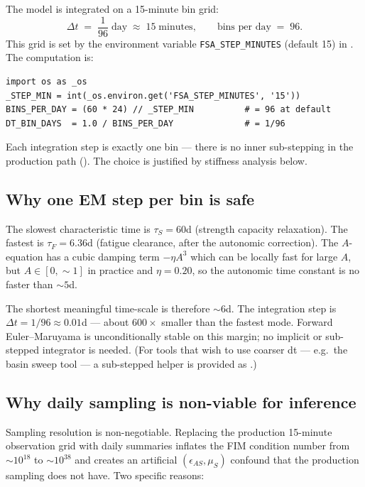 \documentclass[11pt,a4paper]{article}
\theoremstyle{definition}
\begin{document}
The model is integrated on a 15-minute bin grid:
\begin{equation}
\Delta t \;=\; \frac{1}{96}\;\text{day} \;\approx\; 15\;\text{minutes}, \qquad
\text{bins per day} \;=\; 96.
\end{equation}
This grid is set by the environment variable \texttt{FSA\_STEP\_MINUTES}
(default 15) in . The
computation is:
\begin{lstlisting}
import os as _os
_STEP_MIN = int(_os.environ.get('FSA_STEP_MINUTES', '15'))
BINS_PER_DAY = (60 * 24) // _STEP_MIN          # = 96 at default
DT_BIN_DAYS  = 1.0 / BINS_PER_DAY              # = 1/96
\end{lstlisting}

Each integration step is exactly one bin --- there is no inner
sub-stepping in the production path
(). The choice is justified by stiffness
analysis below.

\subsection{Why one EM step per bin is safe}

The slowest characteristic time is $\tau_S = 60$d (strength capacity
relaxation). The fastest is $\tau_F = 6.36$d (fatigue clearance, after
the autonomic correction). The $A$-equation has a cubic damping term
$-\eta A^3$ which can be locally fast for large $A$, but $A \in [0,
\sim 1]$ in practice and $\eta = 0.20$, so the autonomic time constant
is no faster than $\sim 5$d.

The shortest meaningful time-scale is therefore $\sim 6$d. The
integration step is $\Delta t = 1/96 \approx 0.01$d --- about
$600\times$ smaller than the fastest mode. Forward Euler--Maruyama is
unconditionally stable on this margin; no implicit or sub-stepped
integrator is needed. (For tools that wish to use coarser dt --- e.g.\
the basin sweep tool --- a sub-stepped helper is provided as
.)

\subsection{Why daily sampling is non-viable for inference}

Sampling resolution is non-negotiable. Replacing the production
15-minute observation grid with daily summaries inflates the FIM
condition number from $\sim 10^{18}$ to $\sim 10^{38}$ and creates an
artificial $(\epsilon_{AS}, \mu_S)$ confound that the production
sampling does not have. Two specific reasons:
\end{document}
